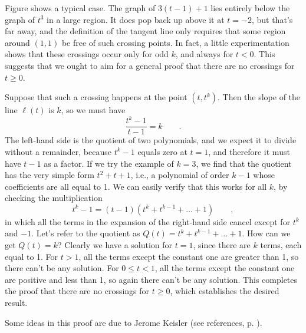 Figure  shows a typical case. 
The graph of $3(t-1)+1$ lies entirely below the graph of $t^3$ in a large region.
It does pop back up above it at $t=-2$, but that's far away, and the definition of
the tangent line only requires that some region around $(1,1)$ be free of such
crossing points. In fact, a little experimentation shows that these crossings occur
only for odd $k$, and always for $t<0$. This suggests that we ought to aim for
a general proof that there are no crossings for $t \ge 0$.


Suppose that such a crossing happens at the point $(t,t^k)$. Then the slope of the
line $\ell(t)$ is $k$, so we must have
\begin{equation*}
  \frac{t^k-1}{t-1} = k \qquad .
\end{equation*}
The left-hand side is the quotient of two polynomials, and we expect it to divide without
a remainder, because $t^k-1$ equals zero at $t=1$, and therefore it must have $t-1$ as a factor.
If we try the example
of $k=3$, we find that the quotient has
the very simple form $t^2+t+1$, i.e., a polynomial of order $k-1$ whose
coefficients are all equal to 1. We can easily verify that this works for
all $k$, by checking the multiplication
\begin{equation*}
  t^k-1 = (t-1)(t^k+t^{k-1}+\ldots+1) \qquad ,
\end{equation*}
in which all the terms in the expansion of the right-hand side cancel except for $t^k$ and $-1$.
Let's refer to the quotient as $Q(t)=t^k+t^{k-1}+\ldots+1$.
How can we get $Q(t)=k$? Clearly we have a solution for $t=1$, since there are $k$ terms,
each equal to 1. For $t>1$, all the terms except the constant one are greater than 1, so
there can't be any solution. For $0 \le t < 1$, all the terms except the constant
one are positive and less than 1, so again there can't be any solution.
This completes the proof that there are no crossings for $t \ge 0$, which establishes
the desired result.


Some ideas in this proof are due to Jerome Keisler (see references, p. \pageref{references}).

